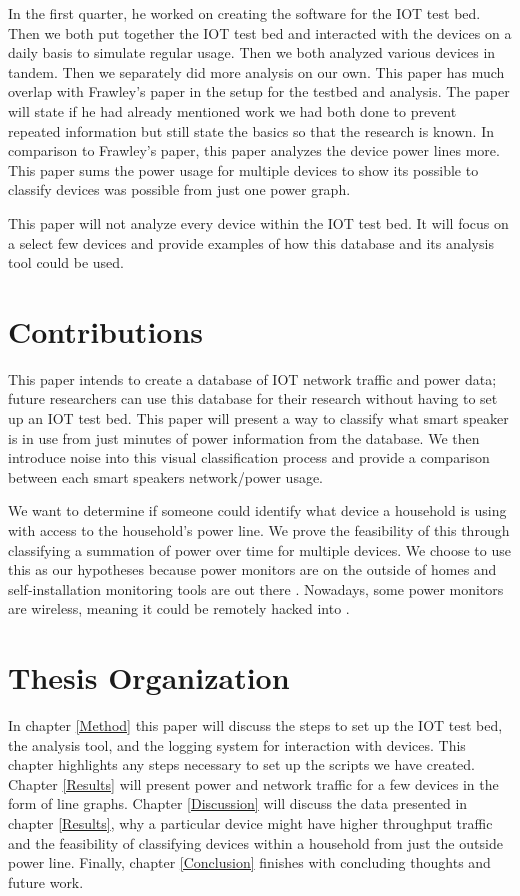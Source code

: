 In the first quarter, he worked on creating the software for the IOT test bed. Then we both put together the IOT test bed and interacted with the devices on a daily basis to simulate regular usage. Then we both analyzed various devices in tandem. Then we separately did more analysis on our own. This paper has much overlap with Frawley's paper in the setup for the testbed and analysis. The paper will state if he had already mentioned work we had both done to prevent repeated information but still state the basics so that the research is known. In comparison to Frawley's paper, this paper analyzes the device power lines more. This paper sums the power usage for multiple devices to show its possible to classify devices was possible from just one power graph.

This paper will not analyze every device within the IOT test bed. It will focus on a select few devices and provide examples of how this database and its analysis tool could be used.

\section{Contributions}
This paper intends to create a database of IOT network traffic and power data; future researchers can use this database for their research without having to set up an IOT test bed. This paper will present a way to classify what smart speaker is in use from just minutes of power information from the database. We then introduce noise into this visual classification process and provide a comparison between each smart speakers network/power usage.

We want to determine if someone could identify what device a household is using with access to the household's power line. We prove the feasibility of this through classifying a summation of power over time for multiple devices. We choose to use this as our hypotheses because power monitors are on the outside of homes and self-installation monitoring tools are out there \cite{griffith_2017}. Nowadays, some power monitors are wireless, meaning it could be remotely hacked into \cite{griffith_2017}.

\section{Thesis Organization}
In chapter \ref{Method} this paper will discuss the steps to set up the IOT test bed, the analysis tool, and the logging system for interaction with devices. This chapter highlights any steps necessary to set up the scripts we have created. Chapter \ref{Results} will present power and network traffic for a few devices in the form of line graphs. Chapter \ref{Discussion} will discuss the data presented in chapter \ref{Results}, why a particular device might have higher throughput traffic and the feasibility of classifying devices within a household from just the outside power line. Finally, chapter \ref{Conclusion} finishes with concluding thoughts and future work.